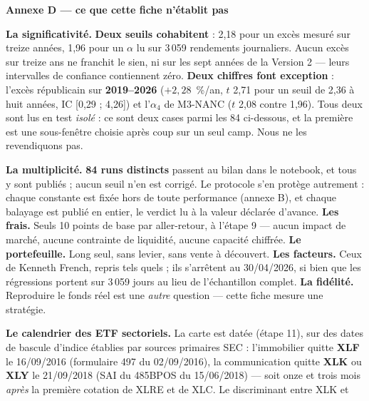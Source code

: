 \documentclass[9pt,a4paper]{extarticle}
\begin{document}
\vspace{0.8mm}
{\color{bleu}\bfseries Annexe D --- ce que cette fiche n'établit pas}\par
\vspace{0.6mm}
{\footnotesize
\textbf{La significativité.} \textbf{Deux seuils cohabitent} : 2,18 pour un excès mesuré sur treize années,
1,96 pour un $\alpha$ lu sur 3\,059 rendements journaliers. Aucun excès sur treize ans ne franchit le sien, ni
sur les sept années de la Version 2 --- leurs intervalles de confiance contiennent zéro. \textbf{Deux chiffres
font exception} : l'excès républicain sur \textbf{2019--2026} ($+2{,}28$~\%/an, $t$ 2,71 pour un seuil de 2,36
à huit années, IC [0,29 ; 4,26]) et l'$\alpha_4$ de M3-NANC ($t$ 2,08 contre 1,96). Tous deux sont lus en test
\emph{isolé} : ce sont deux cases parmi les 84 ci-dessous, et la première est une sous-fenêtre choisie après
coup sur un seul camp. Nous ne les revendiquons pas.\par
\vspace{0.5mm}
\textbf{La multiplicité.} \textbf{84 runs distincts} passent au bilan dans le notebook, et tous y sont publiés ;
aucun seuil n'en est corrigé. Le protocole s'en protège autrement : chaque constante est fixée hors de toute
performance (annexe B), et chaque balayage est publié en entier, le verdict lu à la valeur déclarée d'avance.
\textbf{Les frais.} Seuls 10 points de base par aller-retour, à l'étape 9 --- aucun impact de marché, aucune
contrainte de liquidité, aucune capacité chiffrée. \textbf{Le portefeuille.} Long seul, sans levier, sans
vente à découvert. \textbf{Les facteurs.} Ceux de Kenneth French, repris tels quels ; ils s'arrêtent au
30/04/2026, si bien que les régressions portent sur 3\,059 jours au lieu de l'échantillon complet.
\textbf{La fidélité.} Reproduire le fonds réel est une \emph{autre} question --- cette fiche mesure une
stratégie.\par
\vspace{0.5mm}
\textbf{Le calendrier des ETF sectoriels.} La carte est datée (étape 11), sur des dates de bascule d'indice
établies par sources primaires SEC : l'immobilier quitte \textbf{XLF} le 16/09/2016 (formulaire 497 du
02/09/2016), la communication quitte \textbf{XLK} ou \textbf{XLY} le 21/09/2018 (SAI du 485BPOS du 15/06/2018)
--- soit onze et trois mois \emph{après} la première cotation de XLRE et de XLC. Le discriminant entre XLK et
}
\end{document}
